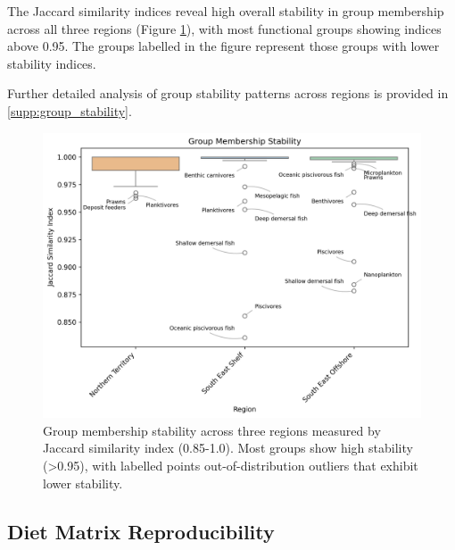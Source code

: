 The Jaccard similarity indices reveal high overall stability in group membership across all three regions (Figure \ref{fig:regional_analysis}), with most functional groups showing indices above 0.95. The groups labelled in the figure represent those groups with lower stability indices.

Further detailed analysis of group stability patterns across regions is provided in \ref{supp:group_stability}.

\begin{figure}[htbp]
    \centering
    \includegraphics[width=\textwidth]{figures/regional_group_analysis.png}
    \caption{Group membership stability across three regions measured by Jaccard similarity index (0.85-1.0). Most groups show high stability (>0.95), with labelled points out-of-distribution outliers that exhibit lower stability.}
    \label{fig:regional_analysis}
\end{figure}



\subsection{Diet Matrix Reproducibility}

